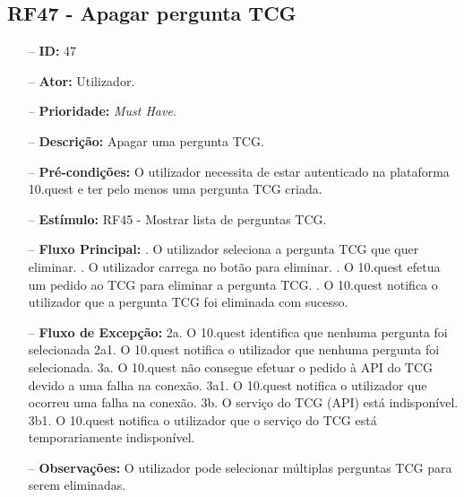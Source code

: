 \subsection{RF47 - Apagar pergunta TCG}
\begin{itemize}
	\item[--] \textbf{ID:} 47
	\item[--]  \textbf{Ator:} Utilizador.
	\item[--]  \textbf{Prioridade:} \textit{Must Have}.
	\item[--]  \textbf{Descrição:} Apagar uma pergunta TCG.
	\item[--]  \textbf{Pré-condições:} O utilizador necessita de estar autenticado na plataforma 10.quest e ter pelo menos uma pergunta TCG criada.
	\item[--]  \textbf{Estímulo:} RF45 - Mostrar lista de perguntas TCG.
	\item[--]  \textbf{Fluxo Principal:} 
	. O utilizador seleciona a pergunta TCG que quer eliminar.
	. O utilizador carrega no botão para eliminar.
	. O 10.quest efetua um pedido ao TCG para eliminar a pergunta TCG.
	. O 10.quest notifica o utilizador que a pergunta TCG foi eliminada com sucesso.
	\item[--]  \textbf{Fluxo de Excepção:} 
	\subitem 2a. O 10.quest identifica que nenhuma pergunta foi selecionada
	\subitem 2a1. O 10.quest notifica o utilizador que nenhuma pergunta foi selecionada.
	\subitem 3a. O 10.quest não consegue efetuar o pedido à API do TCG devido a uma falha na conexão.
	\subitem 3a1. O 10.quest notifica o utilizador que ocorreu uma falha na conexão.
	\subitem 3b. O serviço do TCG (API) está indisponível.
	\subitem 3b1. O 10.quest notifica o utilizador que o serviço do TCG está temporariamente indisponível. 
	\item[--]  \textbf{Observações:} O utilizador pode selecionar múltiplas perguntas TCG para serem eliminadas. 
\end{itemize}
\newpage

